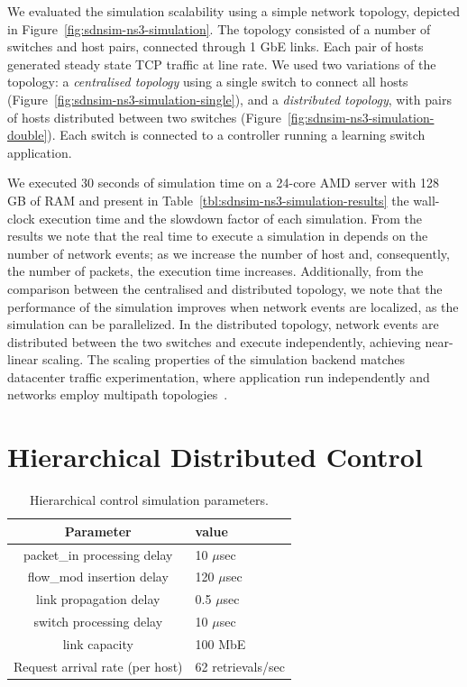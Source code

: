 We evaluated the \sdnsim simulation scalability using a simple network topology,
depicted in Figure~\ref{fig:sdnsim-ns3-simulation}.  The topology consisted of a
number of switches and host pairs, connected through 1 GbE links.  Each pair of
hosts generated steady state TCP traffic at line rate.  We used two variations of
the topology: a \textit{centralised topology} \/using a single switch to connect
all hosts (Figure~\ref{fig:sdnsim-ns3-simulation-single}), and a
\textit{distributed topology}, with pairs of hosts distributed between two
switches (Figure~\ref{fig:sdnsim-ns3-simulation-double}).  Each switch is
connected to a controller running a learning switch application. 

We executed 30 seconds of simulation time on a 24-core AMD server with 128 GB of
RAM and present in Table~\ref{tbl:sdnsim-ns3-simulation-results} the wall-clock
execution time and the slowdown factor of each simulation.  From the results we
note that the real time to execute a simulation in \sdnsim depends on the number
of network events; as we increase the number of host and, consequently, the
number of packets, the execution time increases.  Additionally, from the
comparison between the centralised and distributed topology, we note that the
performance of the simulation improves when network events are localized, as the
simulation can be parallelized. In the distributed topology, network events are
distributed between the two switches and execute independently, achieving
near-linear scaling. The scaling properties of the \sdnsim simulation backend
matches datacenter traffic experimentation, where application run
independently and networks employ multipath topologies~. 

\section{Hierarchical Distributed Control}\label{sec:rdsf-eval}

\begin{table}
\begin{center}
\begin{tabular}{|c| l |} \hline
  Parameter & value \\ \hline
  packet\_in processing delay & 10 $\mu$sec \\ \hline
  flow\_mod insertion delay & 120 $\mu$sec \\ \hline
  link propagation delay & 0.5 $\mu$sec \\ \hline
  switch processing delay & 10 $\mu$sec \\ \hline
  link capacity & 100 MbE \\ \hline
  Request arrival rate (per host) & 62 retrievals/sec \\ \hline
\end{tabular}
\end{center}
\label{tbl:sdnsim_experiment_parameters}
\caption{Hierarchical control simulation parameters.}
\end{table}

